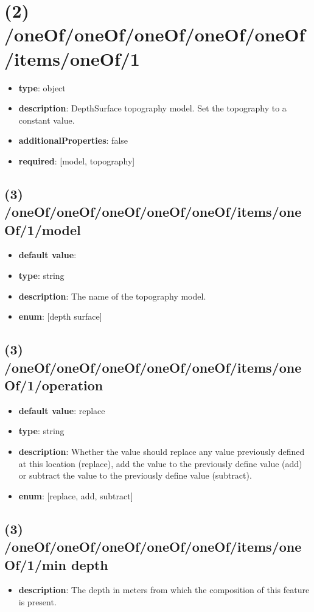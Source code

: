 \section{(2) /oneOf/oneOf/oneOf/oneOf/oneOf/items/oneOf/1}
\begin{itemize}[leftmargin=2em]\item {\bf type}: object
\item {\bf description}: DepthSurface topography model. Set the topography to a constant value.
\item {\bf additionalProperties}: false
\item {\bf required}: [model, topography]\end{itemize}
\subsection{(3) /oneOf/oneOf/oneOf/oneOf/oneOf/items/oneOf/1/model}
\begin{itemize}[leftmargin=3em]\item {\bf default value}: 
\item {\bf type}: string
\item {\bf description}: The name of the topography model.
\item {\bf enum}: [depth surface]\end{itemize}\subsection{(3) /oneOf/oneOf/oneOf/oneOf/oneOf/items/oneOf/1/operation}
\begin{itemize}[leftmargin=3em]\item {\bf default value}: replace
\item {\bf type}: string
\item {\bf description}: Whether the value should replace any value previously defined at this location (replace), add the value to the previously define value (add) or subtract the value to the previously define value (subtract).
\item {\bf enum}: [replace, add, subtract]\end{itemize}\subsection{(3) /oneOf/oneOf/oneOf/oneOf/oneOf/items/oneOf/1/min depth}
\begin{itemize}[leftmargin=3em]\item {\bf description}: The depth in meters from which the composition of this feature is present.
\end{itemize}
